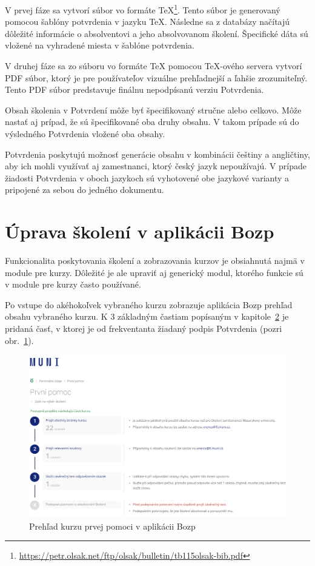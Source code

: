 \documentclass[
  digital,     %
  oneside,     %
  nosansbold,  %
  nocolorbold, %
  lof,         %
  nolot,         %
]{fithesis4}
\begin{document}
V prvej fáze sa vytvorí súbor vo formáte \TeX\footnote{\url{https://petr.olsak.net/ftp/olsak/bulletin/tb115olsak-bib.pdf}}. Tento súbor je generovaný pomocou šablóny potvrdenia v jazyku \TeX. Následne sa z databázy načítajú dôležité informácie o absolventovi a jeho absolvovanom školení. Špecifické dáta sú vložené na vyhradené miesta v šablóne potvrdenia.

V druhej fáze sa zo súboru vo formáte \TeX{} pomocou \TeX-ového servera vytvorí PDF súbor, ktorý je pre používateľov vizuálne prehľadnejší a ľahšie zrozumiteľný. Tento PDF súbor predstavuje finálnu nepodpísanú verziu Potvrdenia.

Obsah školenia v Potvrdení môže byť špecifikovaný stručne alebo celkovo. Môže nastať aj prípad, že sú špecifikované oba druhy obsahu. V takom prípade sú do výsledného Potvrdenia vložené oba obsahy. 

Potvrdenia poskytujú možnosť generácie obsahu v kombinácii češtiny a angličtiny, aby ich mohli využívať aj zamestnanci, ktorý český jazyk nepoužívajú. V prípade žiadosti Potvrdenia v oboch jazykoch sú vyhotovené obe jazykové varianty a pripojené za sebou do jedného dokumentu.

\section{Úprava školení v aplikácii Bozp}
Funkcionalita poskytovania školení a zobrazovania kurzov je obsiahnutá najmä v module pre kurzy. Dôležité je ale upraviť aj generický modul, ktorého funkcie sú v module pre kurzy často používané.

Po vstupe do akéhokoľvek vybraného kurzu zobrazuje aplikácia Bozp prehľad obsahu vybraného kurzu. K 3 základným častiam popísaným v kapitole~\hyperref[kap-2]{2} je pridaná časť, v ktorej je od frekventanta žiadaný podpis Potvrdenia (pozri obr.~\ref{obr1}).

\begin{figure}
  \begin{center}
    \includegraphics[width=\textwidth]{prehledvyberu.png}
  \end{center}
  \caption{Prehľad kurzu prvej pomoci v aplikácii Bozp}
  \label{obr1}
\end{figure}
\end{document}
